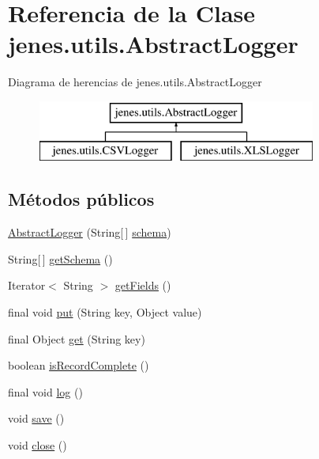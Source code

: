 \hypertarget{classjenes_1_1utils_1_1_abstract_logger}{\section{Referencia de la Clase jenes.\-utils.\-Abstract\-Logger}
\label{classjenes_1_1utils_1_1_abstract_logger}
}
Diagrama de herencias de jenes.\-utils.\-Abstract\-Logger\begin{figure}[H]
\begin{center}
\leavevmode
\includegraphics[height=2.000000cm]{classjenes_1_1utils_1_1_abstract_logger}
\end{center}
\end{figure}
\subsection*{Métodos públicos}
\begin{DoxyCompactItemize}
\item 
\hyperlink{classjenes_1_1utils_1_1_abstract_logger_a357a64e024ede4da833b79455ba63644}{Abstract\-Logger} (String\mbox{[}$\,$\mbox{]} \hyperlink{classjenes_1_1utils_1_1_abstract_logger_a3a2030876857a0512fae7e0ad400c570}{schema})
\item 
String\mbox{[}$\,$\mbox{]} \hyperlink{classjenes_1_1utils_1_1_abstract_logger_a3f4dc79a211f8e01c621d42dec8d4de2}{get\-Schema} ()
\item 
Iterator$<$ String $>$ \hyperlink{classjenes_1_1utils_1_1_abstract_logger_ae939c8578c5342d8f11ff61388ddfd80}{get\-Fields} ()
\item 
final void \hyperlink{classjenes_1_1utils_1_1_abstract_logger_a0f00b8fa60e88b7c2834be7cdf1fc07e}{put} (String key, Object value)
\item 
final Object \hyperlink{classjenes_1_1utils_1_1_abstract_logger_acceb0a183912b0ec7fc95554ab2e3001}{get} (String key)
\item 
boolean \hyperlink{classjenes_1_1utils_1_1_abstract_logger_af4f01e740a9332b8bb32817e01e7b030}{is\-Record\-Complete} ()
\item 
final void \hyperlink{classjenes_1_1utils_1_1_abstract_logger_a26e56f4617fbd249359186c90ec265ba}{log} ()
\item 
void \hyperlink{classjenes_1_1utils_1_1_abstract_logger_a736fbff3759196a70dbf6618f10e8786}{save} ()
\item 
void \hyperlink{classjenes_1_1utils_1_1_abstract_logger_a7d973cbb6b91f254a5430a8875898dbe}{close} ()
\end{DoxyCompactItemize}
